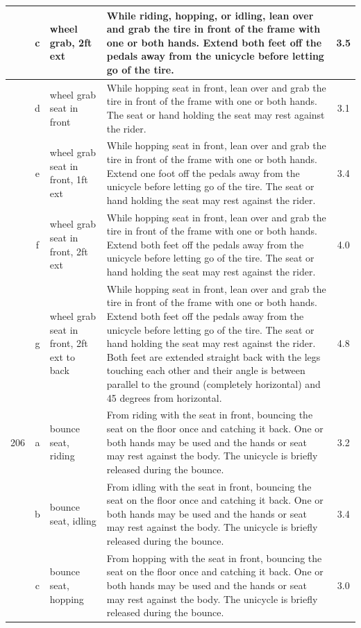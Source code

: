\begin{longtable}{|r|c|p{4cm}|p{8cm}|c|}
\hline
  & c & wheel grab, 2ft ext & While riding, hopping, or idling, lean over and grab the tire in front of the frame with one or both hands. Extend both feet off the pedals away from the unicycle before letting go of the tire. & 3.5 \\ 
\hline
  & d & wheel grab seat in front  & While hopping seat in front, lean over and grab the tire in front of the frame with one or both hands. The seat or hand holding the seat may rest against the rider.  & 3.1 \\ 
\hline
  & e & wheel grab seat in front, 1ft ext & While hopping seat in front, lean over and grab the tire in front of the frame with one or both hands. Extend one foot off the pedals away from the unicycle before letting go of the tire. The seat or hand holding the seat may rest against the rider. & 3.4 \\ 
\hline
  & f & wheel grab seat in front, 2ft ext & While hopping seat in front, lean over and grab the tire in front of the frame with one or both hands. Extend both feet off the pedals away from the unicycle before letting go of the tire. The seat or hand holding the seat may rest against the rider.  & 4.0 \\ 
\hline
  & g & wheel grab seat in front, 2ft ext to back & While hopping seat in front, lean over and grab the tire in front of the frame with one or both hands. Extend both feet off the pedals away from the unicycle before letting go of the tire. The seat or hand holding the seat may rest against the rider. Both feet are extended straight back with the legs touching each other and their angle is between parallel to the ground (completely horizontal) and 45 degrees from horizontal. & 4.8 \\ 
\hline
206 & a & bounce seat, riding & From riding with the seat in front, bouncing the seat on the floor once and catching it back. One or both hands may be used and the hands or seat may rest against the body. The unicycle is briefly released during the bounce.  & 3.2 \\ 
\hline
  & b & bounce seat, idling & From idling with the seat in front, bouncing the seat on the floor once and catching it back. One or both hands may be used and the hands or seat may rest against the body. The unicycle is briefly released during the bounce.  & 3.4 \\ 
\hline
  & c & bounce seat, hopping  & From hopping with the seat in front, bouncing the seat on the floor once and catching it back. One or both hands may be used and the hands or seat may rest against the body. The unicycle is briefly released during the bounce. & 3.0 \\ 

\end{longtable}
